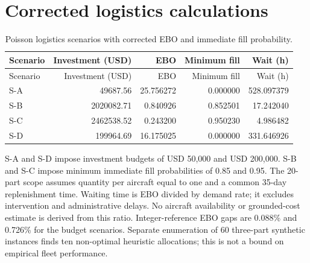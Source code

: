 \section{Corrected logistics calculations}

\begin{small}

\setlength{\tabcolsep}{4pt}

\begin{longtable}{lrrrr}

\caption{Poisson logistics scenarios with corrected EBO and immediate fill probability.}\label{tab:s-logistics}\\

\toprule

Scenario & Investment (USD) & EBO & Minimum fill & Wait (h) \\

\midrule

\endfirsthead

\toprule

Scenario & Investment (USD) & EBO & Minimum fill & Wait (h) \\

\midrule

\endhead

S-A & 49687.56 & 25.756272 & 0.000000 & 528.097379 \\

S-B & 2020082.71 & 0.840926 & 0.852501 & 17.242040 \\

S-C & 2462538.52 & 0.243200 & 0.950230 & 4.986482 \\

S-D & 199964.69 & 16.175025 & 0.000000 & 331.646926 \\

\bottomrule

\end{longtable}

\end{small}

S-A and S-D impose investment budgets of USD 50,000 and USD 200,000. S-B and S-C impose minimum immediate fill probabilities of 0.85 and 0.95. The 20-part scope assumes quantity per aircraft equal to one and a common 35-day replenishment time. Waiting time is EBO divided by demand rate; it excludes intervention and administrative delays. No aircraft availability or grounded-cost estimate is derived from this ratio. Integer-reference EBO gaps are 0.088\% and 0.726\% for the budget scenarios. Separate enumeration of 60 three-part synthetic instances finds ten non-optimal heuristic allocations; this is not a bound on empirical fleet performance.

